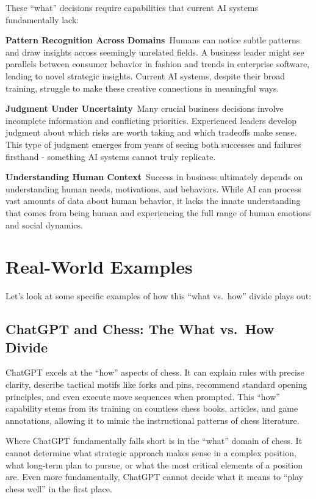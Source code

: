 \documentclass[
  Letterpaper,
]{scrbook}
\begin{document}
These ``what'' decisions require capabilities that current AI systems
fundamentally lack:

\textbf{Pattern Recognition
Across Domains}~Humans can notice subtle patterns and draw insights
across seemingly unrelated fields. A business leader might see parallels
between consumer behavior in fashion and trends in enterprise software,
leading to novel strategic insights. Current AI systems, despite their
broad training, struggle to make these creative connections in
meaningful ways.

\textbf{Judgment Under Uncertainty}~Many crucial business decisions
involve incomplete information and conflicting priorities. Experienced
leaders develop judgment about which risks are worth taking and which
tradeoffs make sense. This type of judgment emerges from years of seeing
both successes and failures firsthand - something AI systems cannot
truly replicate.

\textbf{Understanding Human Context}~Success in business ultimately
depends on understanding human needs, motivations, and behaviors. While
AI can process vast amounts of data about human behavior, it lacks the
innate understanding that comes from being human and experiencing the
full range of human emotions and social dynamics.

\section{Real-World Examples}\label{real-world-examples}

Let's look at some specific examples of how this ``what vs.~how'' divide
plays out:

\subsection{ChatGPT and Chess: The What vs.~How
Divide}\label{chatgpt-and-chess-the-what-vs.-how-divide}

ChatGPT excels at the ``how'' aspects of chess. It can explain rules
with precise clarity, describe tactical motifs like forks and pins,
recommend standard opening principles, and even execute move sequences
when prompted. This ``how'' capability stems from its training on
countless chess books, articles, and game annotations, allowing it to
mimic the instructional patterns of chess literature.

Where ChatGPT fundamentally falls short is in the ``what'' domain of
chess. It cannot determine what strategic approach makes sense in a
complex position, what long-term plan to pursue, or what the most
critical elements of a position are. Even more fundamentally, ChatGPT
cannot decide what it means to ``play chess well'' in the first place.
\end{document}

